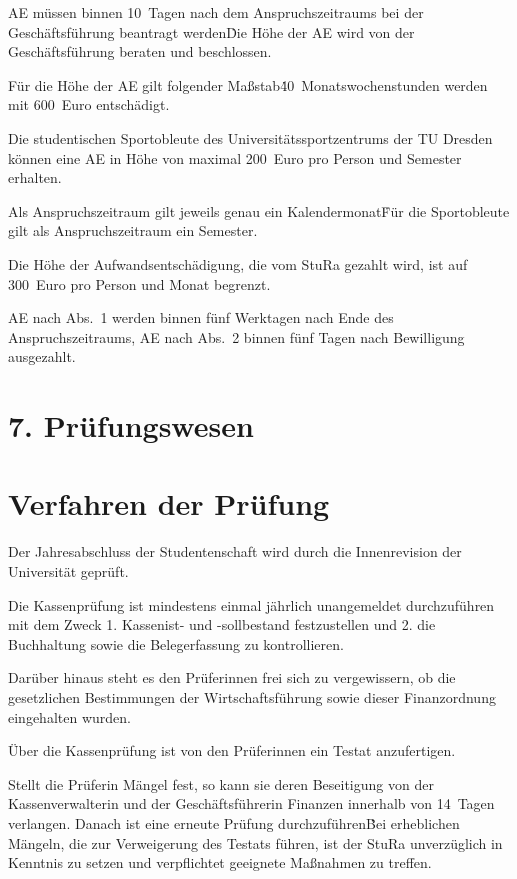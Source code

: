{\begin{multicols}{2}
\Abs \Satz AE müssen binnen 10~Tagen nach dem Anspruchszeitraums bei der Geschäftsführung beantragt werden\. Die Höhe der AE wird von der Geschäftsführung beraten und beschlossen.

\Abs \Satz Für die Höhe der AE gilt folgender Maßstab\. 40~Monatswochenstunden werden mit 600~Euro entschädigt.

\Abs \Satz Die studentischen Sportobleute des Universitätssportzentrums der TU Dresden können eine AE in Höhe von maximal 200~Euro pro Person und Semester erhalten.

\Abs \Satz Als Anspruchszeitraum gilt jeweils genau ein Kalendermonat\. Für die Sportobleute gilt als Anspruchszeitraum ein Semester.

\Abs \Satz Die Höhe der Aufwandsentschädigung, die vom StuRa gezahlt wird, ist auf 300~Euro pro Person und Monat begrenzt.

\Abs \Satz AE nach Abs.~1 werden binnen fünf Werktagen nach Ende des Anspruchszeitraums, AE nach Abs.~2 binnen fünf Tagen nach Bewilligung ausgezahlt.


\section*{7. Prüfungswesen}



\section{Verfahren der Prüfung}

\Abs \Satz Der Jahresabschluss der Studentenschaft wird durch die Innenrevision der Universität geprüft.

\Abs \Satz Die Kassenprüfung ist mindestens einmal jährlich unangemeldet durchzuführen mit dem Zweck
1. Kassenist- und -sollbestand festzustellen und
2. die Buchhaltung sowie die Belegerfassung zu kontrollieren.

\Abs \Satz Darüber hinaus steht es den Prüferinnen frei sich zu vergewissern, ob die gesetzlichen Bestimmungen der Wirtschaftsführung sowie dieser Finanzordnung eingehalten wurden.

\Abs \Satz Über die Kassenprüfung ist von den Prüferinnen ein Testat anzufertigen.

\Abs \Satz Stellt die Prüferin Mängel fest, so kann sie deren Beseitigung von der Kassenverwalterin und der Geschäftsführerin Finanzen innerhalb von 14~Tagen verlangen. Danach ist eine erneute Prüfung durchzuführen\. Bei erheblichen Mängeln, die zur Verweigerung des Testats führen, ist der StuRa unverzüglich in Kenntnis zu setzen und verpflichtet geeignete Maßnahmen zu treffen.


\end{multicols}}
